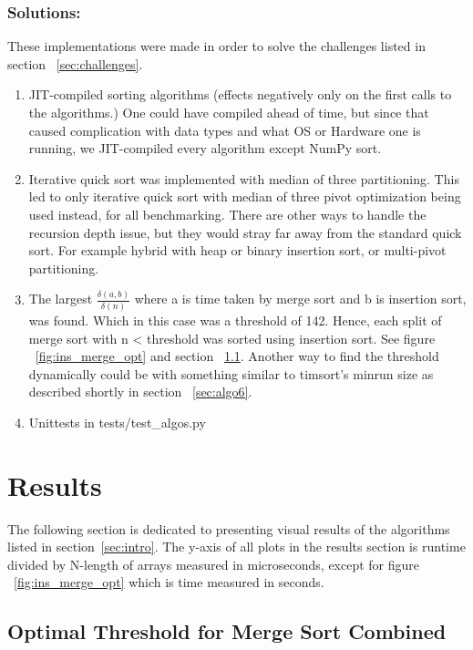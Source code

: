 \documentclass[sigconf, nonacm, natbib, screen, balance=False]{acmart}
\begin{document}
\subsubsection{Solutions:}\label{sec:solutions} These implementations were made in order to solve the challenges listed in section ~\ref{sec:challenges}.

\begin{enumerate}
\item JIT-compiled sorting algorithms (effects negatively only on the first calls to the algorithms.) One could have compiled ahead of time, but since that caused complication with data types and what OS or Hardware one is running, we JIT-compiled every algorithm except NumPy sort.
\item Iterative quick sort was implemented with median of three partitioning. This led to only iterative quick sort with median of three pivot optimization being used instead, for all benchmarking. There are other ways to handle the recursion depth issue, but they would stray far away from the standard quick sort. For example hybrid with heap or binary insertion sort, or multi-pivot partitioning.
\item The largest $\frac{\delta(a, b)}{\delta(n)}$ where a is time taken by merge sort and b is insertion sort, was found. Which in this case was a threshold of 142. Hence, each split of merge sort with n < threshold was sorted using insertion sort. See figure ~\ref{fig:ins_merge_opt} and section ~\ref{sec:res_optimize}. Another way to find the threshold dynamically could be with something similar to timsort's minrun size as described shortly in section ~\ref{sec:algo6}.  

\item Unittests in tests/test\_algos.py

\end{enumerate}

\section{Results}\label{sec:results}
The following section is dedicated to presenting visual results of the algorithms listed in section~\ref{sec:intro}. The y-axis of all plots in the results section is runtime divided by N-length of arrays measured in microseconds, except for figure ~\ref{fig:ins_merge_opt} which is time measured in seconds. 

\subsection{Optimal Threshold for Merge Sort Combined}\label{sec:res_optimize}
\end{document}
